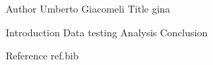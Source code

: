Author Umberto Giacomeli
Title gina

Introduction
Data testing
Analysis
Conclusion

Reference
ref.bib
